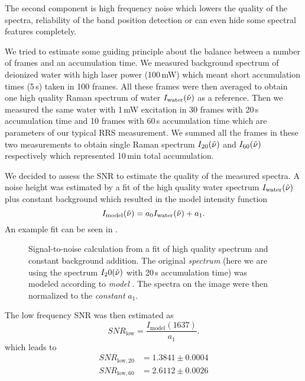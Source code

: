 The second component is high frequency noise which lowers the quality of the
spectra, reliability of the band position detection or can even hide some
spectral features completely.

We tried to estimate some guiding principle about the balance between a number
of frames and an accumulation time. We measured background spectrum of
deionized water with high laser power (100\,mW) which meant short accumulation
times (5\,s) taken in 100 frames. All these frames were then averaged to obtain
one high quality Raman spectrum of water $I_\text{water}(\tilde{\nu})$ as a reference.
Then we measured the same water with 1\,mW excitation in 30 frames with 20\,s
accumulation time and 10 frames with 60\,s accumulation time which are
parameters of our typical RRS measurement. We summed all the frames in these
two measurements to obtain single Raman spectrum $I_{20}(\tilde{\nu})$ and
$I_{60}(\tilde{\nu})$ respectively which represented 10\,min total accumulation.

We decided to assess the SNR to estimate the quality of the measured spectra.
A noise height was estimated by a fit of the high quality water spectrum
$I_\text{water}(\tilde{\nu})$ plus constant background which resulted in the model
intensity function
\begin{equation}
	I_\text{model}(\wn) = a_0 I_\text{water}(\wn) + a_1.
	\label{\eqnlabel{accum_length:sn_model}}
\end{equation}
An example fit can be seen in .

\begin{figure}
	\centering
	
	\caption{Signal-to-noise calculation from a fit of high quality spectrum
		and constant background addition. The original \emph{spectrum} (here we are
		using the spectrum $I_20(\tilde{\nu})$ with 20\,s accumulation time) was modeled
		according to \emph{model} . The spectra on
		the image were then normalized to the \emph{constant} $a_1$.}
	\label{\figlabel{accum_length:sn_ratio}}
\end{figure}

The low frequency SNR was then estimated as
\begin{equation*}
	SNR_\text{low} = \frac{I_\text{model}(1637)}{a_1}.
\end{equation*}
which leads to
\begin{align*}
	SNR_{\text{low},20} &= 1.3841 \pm 0.0004 \\
	SNR_{\text{low},60} &= 2.6112 \pm 0.0026
\end{align*}

